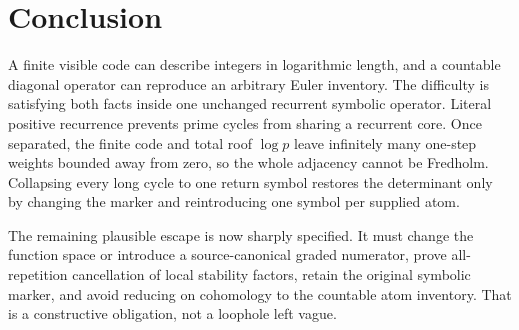\section{Conclusion}

A finite visible code can describe integers in logarithmic length, and a
countable diagonal operator can reproduce an arbitrary Euler inventory.
The difficulty is satisfying both facts inside one unchanged recurrent
symbolic operator.  Literal positive recurrence prevents prime cycles from
sharing a recurrent core.  Once separated, the finite code and total roof
$\log p$ leave infinitely many one-step weights bounded away from zero, so
the whole adjacency cannot be Fredholm.  Collapsing every long cycle to one
return symbol restores the determinant only by changing the marker and
reintroducing one symbol per supplied atom.

The remaining plausible escape is now sharply specified.  It must change
the function space or introduce a source-canonical graded numerator, prove
all-repetition cancellation of local stability factors, retain the original
symbolic marker, and avoid reducing on cohomology to the countable atom
inventory.  That is a constructive obligation, not a loophole left vague.

